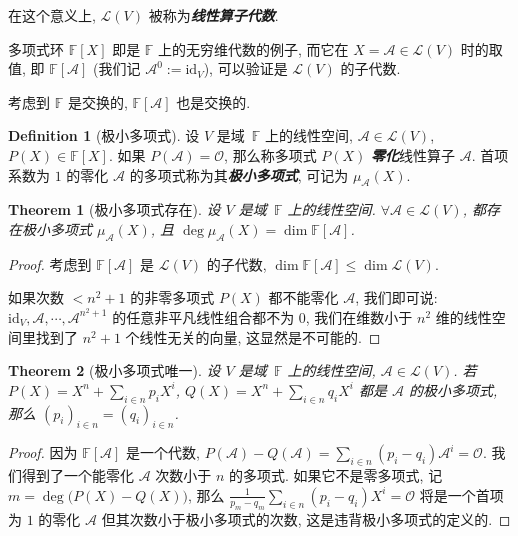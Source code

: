 \documentclass[openany]{ctexbook}
\newcommand*{\indexbf}[1]{\emph{\textbf{#1}}\index{#1}} %
\theoremstyle{plain}
\newtheorem{theorem}{Theorem}[section] %
\theoremstyle{definition}
\newtheorem{definition}{Definition}[section] %
\newcommand*{\id}{\mathrm{id}} %
\begin{document}
在这个意义上, $\mathcal L(V)$ 被称为\indexbf{线性算子代数}.

多项式环 $\mathbb F[X]$ 即是 $\mathbb F$ 上的无穷维代数的例子, 而它在 $X = \mathscr A \in \mathcal L(V)$ 时的取值, 即 $\mathbb F[\mathscr A]$ (我们记 $\mathscr A^0 := \id_V$), 可以验证是 $\mathcal L(V)$ 的子代数.

考虑到 $\mathbb F$ 是交换的, $\mathbb F[\mathscr A]$ 也是交换的. 

\begin{definition}[极小多项式]
	设 $V$ 是域~$\mathbb F$ 上的线性空间, $\mathscr A \in \mathcal L(V)$, $P(X) \in \mathbb F[X]$.
	如果 $P(\mathscr A) = \mathscr O$, 那么称多项式 $P(X)$ \indexbf{零化}线性算子 $\mathscr A$. 首项系数为 $1$ 的零化 $\mathscr A$ 的多项式称为其\indexbf{极小多项式}, 可记为 $\mu_{\mathscr A}(X)$.
\end{definition}

\begin{theorem}[极小多项式存在]
	设 $V$ 是域~$\mathbb F$ 上的线性空间. 
	$\forall \mathscr A \in \mathcal L(V)$, 都存在极小多项式 $\mu_\mathscr A (X)$, 且 $\deg \mu_{\mathscr A} (X) = \dim \mathbb F[\mathscr A]$.
\end{theorem}
\begin{proof}
	考虑到 $\mathbb F[\mathscr A]$ 是 $\mathcal L(V)$ 的子代数, $\dim \mathbb F[\mathscr A] \leq \dim \mathcal L(V)$. 

	如果次数 $< n^2 + 1$ 的非零多项式 $P(X)$ 都不能零化 $\mathscr A$, 我们即可说: 
	$\id_V, \mathscr A, \cdots, \mathscr A^{n^2 + 1}$ 的任意非平凡线性组合都不为 $0$, 我们在维数小于 $n^2$ 维的线性空间里找到了 $n^2 + 1$ 个线性无关的向量, 这显然是不可能的.
\end{proof}

\begin{theorem}[极小多项式唯一]
	设 $V$ 是域~$\mathbb F$ 上的线性空间, $\mathscr A \in \mathcal L(V)$. 
	若 $P(X) = X^n + \sum_{i \in n} p_i X^i$, $Q(X) = X^n + \sum_{i \in n} q_i X^i$ 都是 $\mathscr A$ 的极小多项式, 那么 $(p_i)_{i \in n} = (q_i)_{i \in n}$.
\end{theorem}
\begin{proof}
	因为 $\mathbb F[\mathscr A]$ 是一个代数, $P(\mathscr A) - Q(\mathscr A) = \sum_{i \in n} (p_i - q_i) \mathscr A^i = \mathscr O$. 
	我们得到了一个能零化 $\mathscr A$ 次数小于 $n$ 的多项式. 
	如果它不是零多项式, 记 $m = \deg \big( P(X) - Q(X)\big)$, 那么 $\frac{1}{p_m - q_m} \sum_{i \in n} (p_i - q_i) X^i = \mathscr O$ 将是一个首项为 $1$ 的零化 $\mathscr A$ 但其次数小于极小多项式的次数, 这是违背极小多项式的定义的.
\end{proof}
\end{document}
